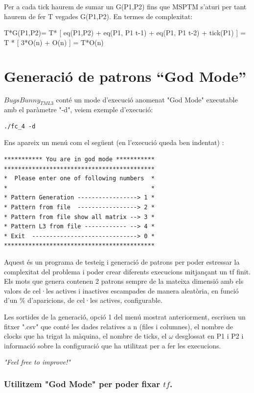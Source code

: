\documentclass[12pt,a4paper]{report}
\def \w{$\omega$}
\def \tml3{$BugsBunny_{TML3} $}
\begin{document}
Per a cada tick haurem de sumar un G(P1,P2) fins que MSPTM s’aturi per tant haurem de fer T vegades G(P1,P2). En termes de complexitat:

\begin{center}
T*G(P1,P2)= T* [ eq(P1,P2) + eq(P1, P1 t-1) + eq(P1, P1 t-2) + tick(P1) ] =  T * [ 3*O(n) + O(n) ] = T*O(n)
\end{center}

\section{Generació de patrons “God Mode”}

\tml3{} conté un mode d’execució anomenat "God Mode" executable amb el paràmetre "-d", veiem exemple d’execució: 

\begin{lstlisting}
./fc_4 -d
\end{lstlisting}


Ens apareix un menú com el següent (en l'execució queda ben indentat) :

\begin{lstlisting}
*********** You are in god mode ***********
*******************************************
*  Please enter one of following numbers  *
*                                         *
* Pattern Generation -----------------> 1 *
* Pattern from file  -----------------> 2 *
* Pattern from file show all matrix --> 3 *
* Pattern L3 from file ------------ --> 4 *
* Exit  ------------------------------> 0 *
*******************************************
\end{lstlisting}


Aquest és un programa de testeig i generació de patrons per poder estressar la complexitat del problema i poder crear diferents execucions mitjançant un tf finit. Els mots que genera contenen 2 patrons sempre de la mateixa dimensió amb els valors de cel·les actives i inactives escampades de manera aleatòria, en funció d’un \% d’aparicions, de cel·les actives, configurable.

Les sortides de la generació, opció 1 del menú mostrat anteriorment, escriuen un fitxer ".csv" que conté les dades relatives a n (files i columnes), el nombre de clocks que ha trigat la màquina, el nombre de ticks, el \w{} desglossat en P1 i P2 i informació sobre la configuració que ha utilitzat per a fer les execucions.

\textit{"Feel free to improve!"}

\subsubsection{Utilitzem "God Mode" per poder fixar $tf$. }
\end{document}

